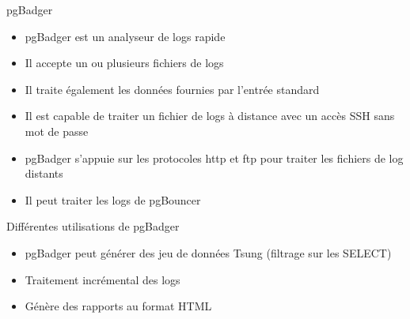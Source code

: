 
\begin{frame}{pgBadger}

   \begin{itemize}
      \item pgBadger est un analyseur de logs rapide
      \item Il accepte un ou plusieurs fichiers de logs
      \item Il traite également les données fournies par l'entrée standard
      \item Il est capable de traiter un fichier de logs à distance avec un accès SSH sans mot de passe
      \item pgBadger s'appuie sur les protocoles http et ftp pour traiter les fichiers de log distants
      \item Il peut traiter les logs de pgBouncer

   \end{itemize}

\begin{tiny}
\begin{toile}
\end{toile}
\end{tiny}

\end{frame}


\begin{frame}{Différentes utilisations de pgBadger}

   \begin{itemize}
      \item pgBadger peut générer des jeu de données Tsung (filtrage sur les SELECT)
      \item Traitement incrémental des logs
      \item Génère des rapports au format HTML

   \end{itemize}

\end{frame}


